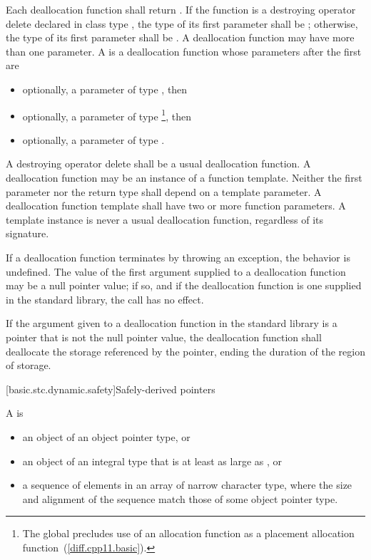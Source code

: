 \pnum
{}%
Each deallocation function shall return .
If the function is a destroying operator delete
declared in class type ,
the type of its first parameter shall be ;
otherwise, the type of its first
parameter shall be . A deallocation function may have more
than one parameter.
%
A  is a deallocation function
whose parameters after the first are
\begin{itemize}
\item
optionally, a parameter of type , then
\item
optionally, a parameter of type %
\footnote{The global 
precludes use of an
allocation function  as a placement
allocation function~(\ref{diff.cpp11.basic}).}, then
\item
optionally, a parameter of type .
\end{itemize}
A destroying operator delete shall be a usual deallocation function.
A deallocation function may be an instance of a function
template. Neither the first parameter nor the return type shall depend
on a template parameter.
A deallocation
function template shall have two or more function parameters. A template
instance is never a usual deallocation function, regardless of its
signature.

\pnum
If a deallocation function terminates by throwing an exception, the behavior is undefined.
The value of the first argument supplied to a deallocation function may
be a null pointer value; if so, and if the deallocation function is one
supplied in the standard library, the call has no effect.

\pnum
If the argument given to a deallocation function in the standard library
is a pointer that is not the null pointer value, the
deallocation function shall deallocate the storage referenced by the
pointer, ending the duration of the region of storage.

[basic.stc.dynamic.safety]{Safely-derived pointers}

\pnum
{}%
%
A  is
\begin{itemize}
\item an object of an object pointer
type, or
\item an object of an integral type that is at least as large as ,
or
\item a sequence of elements in an array of narrow character
type, where the size and alignment of the sequence
match those of some object pointer type.
\end{itemize}

